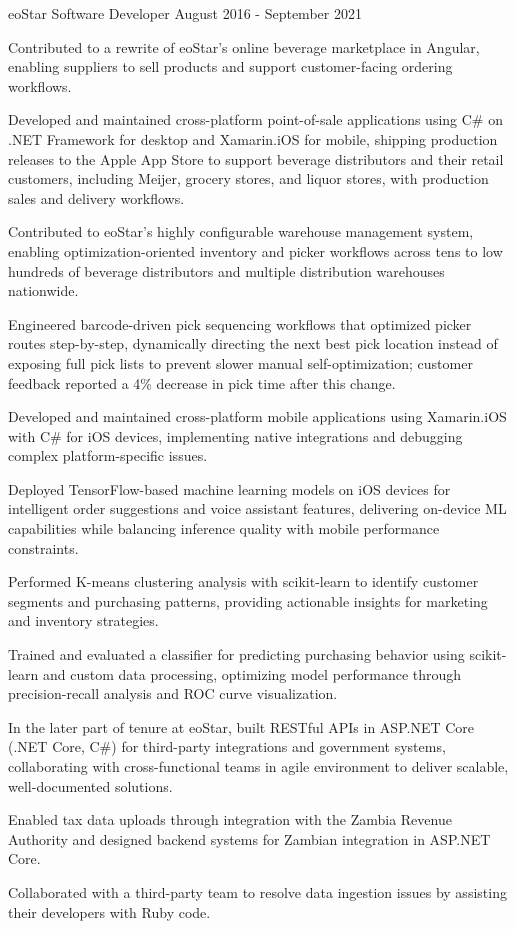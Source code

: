 \documentclass{../styles/cv}
\begin{document}
\subsectionpositiondate
    {eoStar}
    {Software Developer}
    {August 2016 - September 2021}
\resumesublistbegin
    \item Contributed to a rewrite of eoStar's online beverage marketplace in Angular, enabling suppliers to sell products and support customer-facing ordering workflows.
    \item Developed and maintained cross-platform point-of-sale applications using C\# on .NET Framework for desktop and Xamarin.iOS for mobile, shipping production releases to the Apple App Store to support beverage distributors and their retail customers, including Meijer, grocery stores, and liquor stores, with production sales and delivery workflows.
    \item Contributed to eoStar's highly configurable warehouse management system, enabling optimization-oriented inventory and picker workflows across tens to low hundreds of beverage distributors and multiple distribution warehouses nationwide.
    \item Engineered barcode-driven pick sequencing workflows that optimized picker routes step-by-step, dynamically directing the next best pick location instead of exposing full pick lists to prevent slower manual self-optimization; customer feedback reported a 4\% decrease in pick time after this change.
    \item Developed and maintained cross-platform mobile applications using Xamarin.iOS with C\# for iOS devices, implementing native integrations and debugging complex platform-specific issues.
    \item Deployed TensorFlow-based machine learning models on iOS devices for intelligent order suggestions and voice assistant features, delivering on-device ML capabilities while balancing inference quality with mobile performance constraints.
    \item Performed K-means clustering analysis with scikit-learn to identify customer segments and purchasing patterns, providing actionable insights for marketing and inventory strategies.
    \item Trained and evaluated a classifier for predicting purchasing behavior using scikit-learn and custom data processing, optimizing model performance through precision-recall analysis and ROC curve visualization.
    \item In the later part of tenure at eoStar, built RESTful APIs in ASP.NET Core (.NET Core, C\#) for third-party integrations and government systems, collaborating with cross-functional teams in agile environment to deliver scalable, well-documented solutions.
    \item Enabled tax data uploads through integration with the Zambia Revenue Authority and designed backend systems for Zambian integration in ASP.NET Core.
    \item Collaborated with a third-party team to resolve data ingestion issues by assisting their developers with Ruby code.
\resumesublistend
\end{document}
